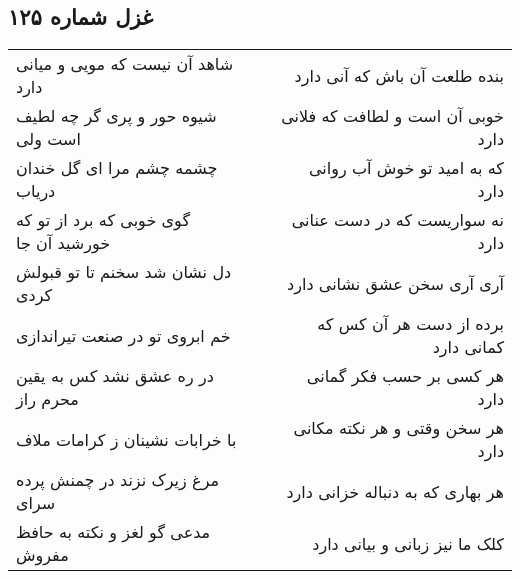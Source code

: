 \begin{center}
\section*{غزل شماره ۱۲۵}
\label{sec:sh125}
\begin{longtable}{l p{0.5cm} r}
شاهد آن نیست که مویی و میانی دارد
&&
بنده طلعت آن باش که آنی دارد
\\
شیوه حور و پری گر چه لطیف است ولی
&&
خوبی آن است و لطافت که فلانی دارد
\\
چشمه چشم مرا ای گل خندان دریاب
&&
که به امید تو خوش آب روانی دارد
\\
گوی خوبی که برد از تو که خورشید آن جا
&&
نه سواریست که در دست عنانی دارد
\\
دل نشان شد سخنم تا تو قبولش کردی
&&
آری آری سخن عشق نشانی دارد
\\
خم ابروی تو در صنعت تیراندازی
&&
برده از دست هر آن کس که کمانی دارد
\\
در ره عشق نشد کس به یقین محرم راز
&&
هر کسی بر حسب فکر گمانی دارد
\\
با خرابات نشینان ز کرامات ملاف
&&
هر سخن وقتی و هر نکته مکانی دارد
\\
مرغ زیرک نزند در چمنش پرده سرای
&&
هر بهاری که به دنباله خزانی دارد
\\
مدعی گو لغز و نکته به حافظ مفروش
&&
کلک ما نیز زبانی و بیانی دارد
\\
\end{longtable}
\end{center}
